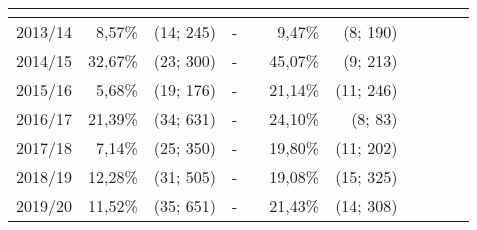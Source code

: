 \begin{table}[H]
\begin{tabular}{|c|*{5}{rr|}}
        \multicolumn{2}{c|}{}
        \\
        \hline
        2013/14 &  8,57\% & (14; 245) & - &  &  9,47\% &  (8; 190) &  &  &  &  \\
        2014/15 & 32,67\% & (23; 300) & - &  & 45,07\% &  (9; 213) &  &  &  &  \\
        2015/16 &  5,68\% & (19; 176) & - &  & 21,14\% & (11; 246) &  &  &  &  \\
        2016/17 & 21,39\% & (34; 631) & - &  & 24,10\% &   (8; 83) &  &  &  &  \\
        2017/18 &  7,14\% & (25; 350) & - &  & 19,80\% & (11; 202) &  &  &  &  \\
        2018/19 & 12,28\% & (31; 505) & - &  & 19,08\% & (15; 325) &  &  &  &  \\
        2019/20 & 11,52\% & (35; 651) & - &  & 21,43\% & (14; 308) &  &  &  &  \\        
        \hline
    \end{tabular}
\end{table}